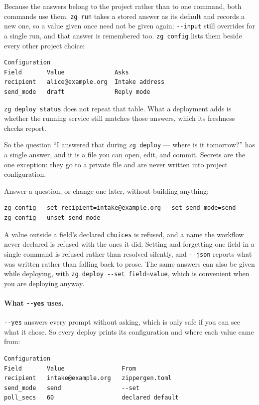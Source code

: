 \documentclass[11pt,a4paper]{article}
\begin{document}
Because the answers belong to the project rather than to one command, both
commands use them. \texttt{zg run} takes a stored answer as its default and
records a new one, so a value given once need not be given again; \texttt{-{}-input}
still overrides for a single run, and that answer is remembered too.
\texttt{zg config} lists them beside every other project choice:

\begin{lstlisting}[style=shell]
Configuration
Field       Value              Asks
recipient   alice@example.org  Intake address
send_mode   draft              Reply mode
\end{lstlisting}

\texttt{zg deploy status} does not repeat that table. What a deployment adds is
whether the running service still matches those answers, which its freshness
checks report.

So the question ``I answered that during \texttt{zg deploy} --- where is it
tomorrow?'' has a single answer, and it is a file you can open, edit, and
commit. Secrets are the one exception: they go to a private file and are never
written into project configuration.

Answer a question, or change one later, without building anything:

\begin{lstlisting}[style=shell]
zg config --set recipient=intake@example.org --set send_mode=send
zg config --unset send_mode
\end{lstlisting}

A value outside a field's declared \texttt{choices} is refused, and a name the
workflow never declared is refused with the ones it did. Setting and forgetting
one field in a single command is refused rather than resolved silently, and
\texttt{-{}-json} reports what was written rather than falling back to prose. The same answers can
also be given while deploying, with \texttt{zg deploy -{}-set field=value},
which is convenient when you are deploying anyway.

\paragraph{What \texttt{-{}-yes} uses.} \texttt{-{}-yes} answers every prompt
without asking, which is only safe if you can see what it chose. So every
deploy prints its configuration and where each value came from:

\begin{lstlisting}[style=shell]
Configuration
Field       Value                From
recipient   intake@example.org   zippergen.toml
send_mode   send                 --set
poll_secs   60                   declared default
\end{lstlisting}
\end{document}
